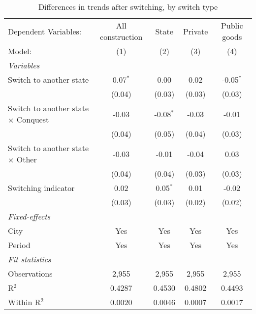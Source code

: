 \begin{table}[htbp]
   \caption{\label{tab:window_100y} Differences in trends after switching, by switch type}
   \centering
   \begin{tabular}{lcccc}
      \tabularnewline \midrule \midrule
      Dependent Variables:                       & All construction & State       & Private & Public goods\\  
      Model:                                     & (1)              & (2)         & (3)     & (4)\\  
      \midrule
      \emph{Variables}\\
      Switch to another state                    & 0.07$^{*}$       & 0.00        & 0.02    & -0.05$^{*}$\\   
                                                 & (0.04)           & (0.03)      & (0.03)  & (0.03)\\   
      Switch to another state $\times$ Conquest  & -0.03            & -0.08$^{*}$ & -0.03   & -0.01\\   
                                                 & (0.04)           & (0.05)      & (0.04)  & (0.03)\\   
      Switch to another state $\times$ Other     & -0.03            & -0.01       & -0.04   & 0.03\\   
                                                 & (0.04)           & (0.04)      & (0.03)  & (0.03)\\   
      Switching indicator                        & 0.02             & 0.05$^{*}$  & 0.01    & -0.02\\   
                                                 & (0.03)           & (0.03)      & (0.02)  & (0.02)\\   
      \midrule
      \emph{Fixed-effects}\\
      City                                       & Yes              & Yes         & Yes     & Yes\\  
      Period                                     & Yes              & Yes         & Yes     & Yes\\  
      \midrule
      \emph{Fit statistics}\\
      Observations                               & 2,955            & 2,955       & 2,955   & 2,955\\  
      R$^2$                                      & 0.4287           & 0.4530      & 0.4802  & 0.4493\\  
      Within R$^2$                               & 0.0020           & 0.0046      & 0.0007  & 0.0017\\  
      \midrule \midrule
      

\end{tabular}
\end{table}
